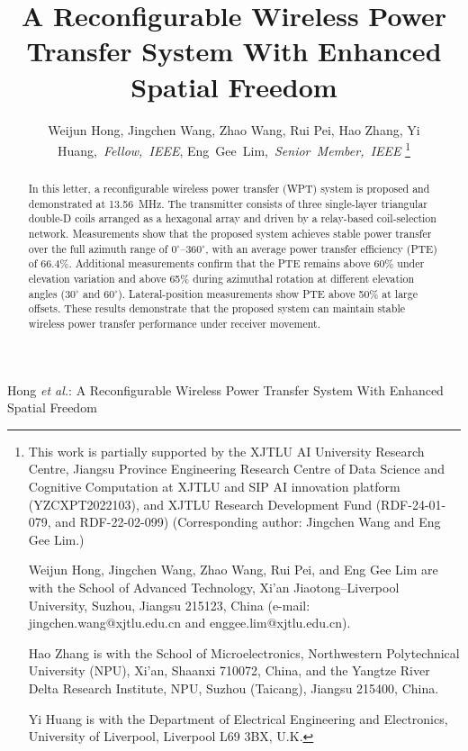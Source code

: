 \documentclass[journal]{IEEEtran}
\begin{document}
\title{A Reconfigurable Wireless Power Transfer System With Enhanced Spatial Freedom}
\author{Weijun Hong, Jingchen Wang, Zhao Wang, Rui Pei, Hao Zhang, Yi Huang,~\textit{Fellow,~IEEE}, Eng~Gee~Lim,~\textit{Senior~Member,~IEEE}
\thanks{This work is partially supported by the XJTLU AI University Research Centre, Jiangsu Province Engineering Research Centre of Data Science and Cognitive Computation at XJTLU and SIP AI innovation platform (YZCXPT2022103), and XJTLU Research Development Fund (RDF-24-01-079, and RDF-22-02-099) (Corresponding author: Jingchen Wang and Eng Gee Lim.)

Weijun Hong, Jingchen Wang, Zhao Wang, Rui Pei, and Eng Gee Lim are with the School of Advanced Technology, Xi'an Jiaotong--Liverpool University, Suzhou, Jiangsu 215123, China (e-mail: jingchen.wang@xjtlu.edu.cn and enggee.lim@xjtlu.edu.cn).

Hao Zhang is with the School of Microelectronics, Northwestern Polytechnical University (NPU), Xi'an, Shaanxi 710072, China, and the Yangtze River Delta Research Institute, NPU, Suzhou (Taicang), Jiangsu 215400, China.

Yi Huang is with the Department of Electrical Engineering and Electronics,
University of Liverpool, Liverpool L69 3BX, U.K.}}

%
{Hong \MakeLowercase{\textit{et al.}}: A Reconfigurable Wireless Power Transfer System With Enhanced Spatial Freedom}

\maketitle

\begin{abstract}
In this letter, a reconfigurable wireless power transfer (WPT) system is proposed and demonstrated at 13.56~MHz. The transmitter consists of three single-layer triangular double-D coils arranged as a hexagonal array and driven by a relay-based coil-selection network. Measurements show that the proposed system achieves stable power transfer over the full azimuth range of 0$^\circ$--360$^\circ$, with an average power transfer efficiency (PTE) of 66.4\%. Additional measurements confirm that the PTE remains above 60\% under elevation variation and above 65\% during azimuthal rotation at different elevation angles (30$^\circ$ and 60$^\circ$). Lateral-position measurements show PTE above 50\% at large offsets. These results demonstrate that the proposed system can maintain stable wireless power transfer performance under receiver movement.
\end{abstract}
\end{document}
